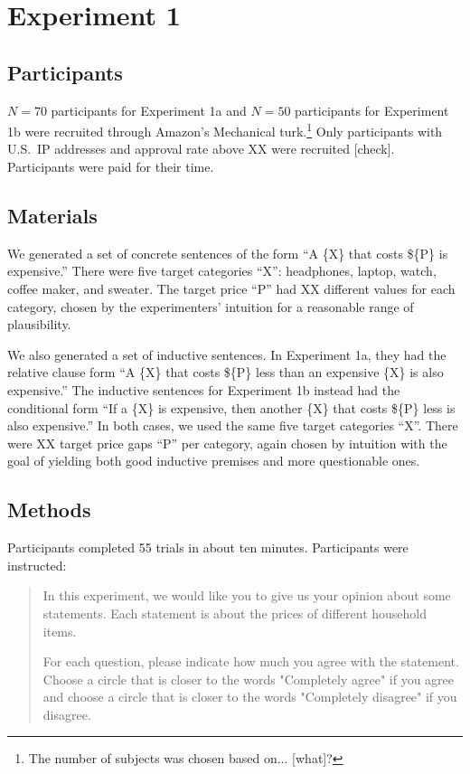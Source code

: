 \documentclass[11pt]{amsart}
\newcommand{\ndg}[1]{{\color{ForestGreen}[#1]}}
\begin{document}
\section{Experiment 1}
\label{exp1}

\subsection{Participants}

$N=70$ participants for Experiment 1a and $N=50$ participants for Experiment 1b were recruited through Amazon's Mechanical turk.\footnote{The number of subjects was chosen based on... \ndg{what}?} 
Only participants with U.S.~IP addresses and approval rate above XX were recruited \ndg{check}.
Participants were paid for their time.

\subsection{Materials}

We generated a set of concrete sentences of the form ``A \{X\} that costs \$\{P\} is expensive.'' 
There were five target categories ``X'': headphones, laptop, watch, coffee maker, and sweater.
The target price ``P'' had XX different values for each category, chosen by the experimenters' intuition for a reasonable range of plausibility.

We also generated a set of inductive sentences. 
In Experiment 1a, they had the relative clause form ``A \{X\} that costs \$\{P\} less than an expensive \{X\} is also expensive.''
The inductive sentences for Experiment 1b instead had the conditional form ``If a \{X\} is expensive, then another \{X\} that costs \$\{P\} less is also expensive.''
In both cases, we used the same five target categories ``X''. 
There were XX target price gaps ``P'' per category, again chosen by intuition with the goal of yielding both good inductive premises and more questionable ones.

\subsection{Methods}

Participants completed 55 trials in about ten minutes.
Participants were instructed:

\begin{quote}
In this experiment, we would like you to give us your opinion about some statements. Each statement is about the prices of different household items.

For each question, please indicate how much you agree with the statement. Choose a circle that is closer to the words "Completely agree" if you agree and choose a circle that is closer to the words "Completely disagree" if you disagree.
\end{quote}
\end{document}
